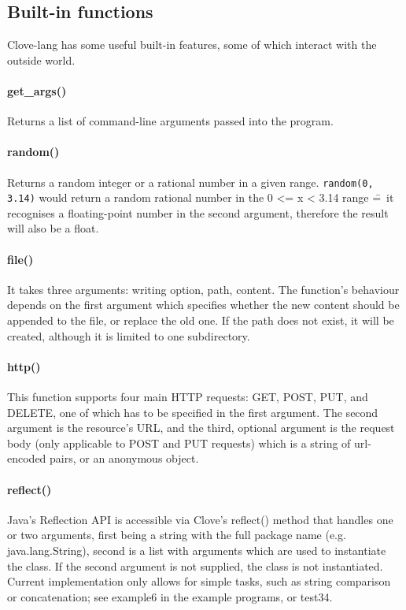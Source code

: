 \documentclass[12pt,a4paper]{article}
\begin{document}
\vspace{-1.5em}
\subsection*{Built-in functions}
Clove-lang has some useful built-in features, some of which interact with the outside world.

\paragraph*{get\_args()}
Returns a list of command-line arguments passed into the program.

\vspace{-0.75em}
\paragraph*{random()}
Returns a random integer or a rational number in a given range. \texttt{random(0, 3.14)} would return a random rational number in the 0 <= x < 3.14 range \==~it recognises a floating-point number in the second argument, therefore the result will also be a float.

\vspace{-0.75em}
\paragraph*{file()}
It takes three arguments: writing option, path, content. The function's behaviour depends on the first argument which specifies whether the new content should be appended to the file, or replace the old one. If the path does not exist, it will be created, although it is limited to one subdirectory.

\vspace{-0.75em}
\paragraph*{http()}
This function supports four main HTTP requests: GET, POST, PUT, and DELETE, one of which has to be specified in the first argument. The second argument is the resource's URL, and the third, optional argument is the request body (only applicable to POST and PUT requests) which is a string of url-encoded pairs, or an anonymous object.

\vspace{-0.75em}
\paragraph*{reflect()}
Java's Reflection API is accessible via Clove's reflect() method that handles one or two arguments, first being a string with the full package name (e.g. java.lang.String), second is a list with arguments which are used to instantiate the class. If the second argument is not supplied, the class is not instantiated. Current implementation only allows for simple tasks, such as string comparison or concatenation; see example6 in the example programs, or test34.

\end{document}
